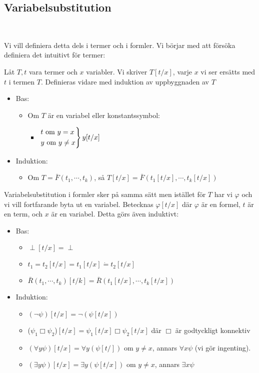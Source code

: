 \subsection{Variabelsubstitution}\hfill\\
\par\bigskip
\noindent Vi vill definiera detta dels i termer och i formler. Vi börjar med att försöka definiera det intuitivt för termer:
\par\bigskip
\noindent Låt $T, t$ vara termer och $x$ variabler. Vi skriver $T[t/x]$, varje $x$ vi ser ersätts med $t$ i termen $T$. Definieras vidare med induktion av uppbyggnaden av $T$ 
\par\bigskip
\begin{itemize}
  \item Bas:
    \begin{itemize}
      \item Om $T$ är en variabel eller konstantssymbol:
        \begin{itemize}
          \item $\begin{rcases*}t \text{ om } y=x\\y\text{ om }y\neq x\end{rcases*}y[t/x]$ 
        \end{itemize}
    \end{itemize}
  \item Induktion:
    \begin{itemize}
      \item Om $T=\bar{F}(t_1,\cdots,t_k)$, så $T[t/x]=\bar{F}(t_1[t/x],\cdots, t_k[t/x])$
    \end{itemize}
\end{itemize}
\par\bigskip
\noindent Variabelsubstitution i formler sker på samma sätt men istället för $T$ har vi $\varphi$ och vi vill fortfarande byta ut en variabel. Betecknas $\varphi[t/x]$ där $\varphi$ är en formel, $t$ är en term, och $x$ är en variabel. Detta görs även induktivt:
\par\bigskip
\begin{itemize}
  \item Bas:
    \begin{itemize}
      \item$\perp[t/x] = \perp$
      \item $t_1 = t_2[t/x]= t_1[t/x]\dot{=}t_2[t/x]$
      \item$\bar{R}(t_1,\cdots,t_k)[t/k]=\bar{R}(t_1[t/x],\cdots, t_k[t/x])$
    \end{itemize}
  \item Induktion:
    \begin{itemize}
      \item $(\neg\psi)[t/x]=\neg(\psi[t/x])$
      \item ($\psi_1\Box\psi_2$)$[t/x] = \psi_1[t/x]\Box\psi_2[t/x]$ där $\Box$ är godtyckligt konnektiv
      \item $(\forall y\psi)[t/x] = \forall y(\psi[t/])$ om $y\neq x$, annars $\forall x\psi$ (vi gör ingenting).
      \item $(\exists y\psi)[t/x] = \exists y(\psi[t/x])$ om $y\neq x$, annars $\exists x\psi$
    \end{itemize}
\end{itemize}
